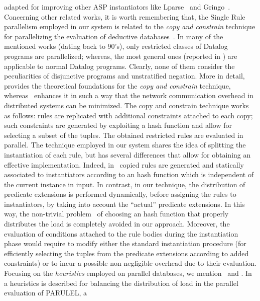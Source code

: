 \documentclass[preprint]{tlp}
\begin{document}
adapted for improving other ASP instantiators
like Lparse~\cite{niem-simo-97} and Gringo~\cite{gebs-etal-2007-gringo}.
Concerning other related works, it is worth remembering that, the
Single Rule parallelism employed in our system is related to the
{\em copy and constrain} technique for parallelizing the evaluation of deductive
databases~\cite{wolf-silb-1988,wolf-ozer-90,gang-etal-90,zhan-etal-1995,dewa-etal-94}.
In many of the mentioned works (dating back to 90's), only restricted classes of
Datalog programs are parallelized; whereas, the most general ones
(reported in \cite{wolf-ozer-90,zhan-etal-1995}) are applicable to
normal Datalog programs. Clearly, none of them consider the
peculiarities of disjunctive programs and unstratified negation.
More in detail, \cite{wolf-ozer-90} provides the theoretical
foundations for the {\em copy and constrain} technique,
whereas~\cite{zhan-etal-1995} enhances it in such a way that
the network communication overhead in distributed systems can be minimized.
The copy and constrain technique works as follows: rules are replicated
with additional constraints attached to each copy;
such constraints are generated by exploiting a hash function
and allow for selecting a subset of the tuples.
The obtained restricted rules are evaluated in parallel. The technique employed in our system
shares the idea of splitting the instantiation of each
rule, but has several differences that allow for obtaining an
effective implementation. Indeed,
in~\cite{wolf-ozer-90,zhan-etal-1995} copied rules are generated and
statically associated to instantiators according to an hash function
which is independent of the current instance in input. In contrast,
in our technique, the distribution of predicate extensions is
performed dynamically, before assigning  the rules to instantiators,
by taking into account the ``actual'' predicate extensions. In this
way, the non-trivial problem~\cite{zhan-etal-1995} of choosing an
hash function that properly distributes the load is completely
avoided in our approach. Moreover, the evaluation of conditions
attached to the rule bodies during the instantiation phase
would require to modify either the standard instantiation procedure
(for efficiently selecting the tuples from the predicate extensions according
to added constraints) or to incur a possible non negligible overhead
due to their evaluation.
Focusing on the {\em heuristics} employed on parallel databases, we
mention~\cite{dewa-etal-94} and \cite{carey-et-all-86}.
In~\cite{dewa-etal-94}  a heuristics is described for balancing the
distribution of load in the parallel evaluation of PARULEL, a
\end{document}
